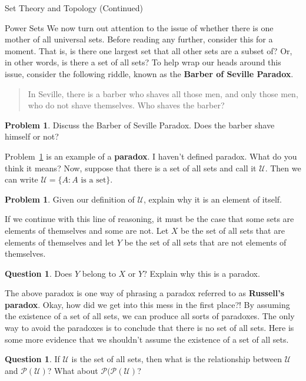 \documentclass[11pt]{article}
\theoremstyle{definition}
\newtheorem{problem}[theorem]{Problem}
\newtheorem{question}[theorem]{Question}
\begin{document}
\begin{section}{Set Theory and Topology (Continued)}
\begin{subsection}{Power Sets}
We now turn out attention to the issue of whether there is one mother of all universal sets.  Before reading any further, consider this for a moment.  That is, is there one largest set that all other sets are a subset of?  Or, in other words, is there a set of all sets?  To help wrap our heads around this issue, consider the following riddle, known as the \textbf{Barber of Seville Paradox}.

\begin{quote}
In Seville, there is a barber who shaves all those men, and only those men, who do not shave themselves.  Who shaves the barber?
\end{quote}

\begin{problem}\label{barber}
Discuss the Barber of Seville Paradox.  Does the barber shave himself or not?
\end{problem}

Problem~\ref{barber} is an example of a \textbf{paradox}.  I haven't defined paradox.  What do you think it means?  Now, suppose that there is a set of all sets and call it $\mathcal{U}$.  Then we can write $\mathcal{U}=\{A:A\mbox{ is a set}\}$.

\begin{problem}
Given our definition of $\mathcal{U}$, explain why it is an element of itself.
\end{problem}

If we continue with this line of reasoning, it must be the case that some sets are elements of themselves and some are not.  Let $X$ be the set of all sets that are elements of themselves and let $Y$ be the set of all sets that are not elements of themselves.

\begin{question}
Does $Y$ belong to $X$ or $Y$?  Explain why this is a paradox.
\end{question}

The above paradox is one way of phrasing a paradox referred to as \textbf{Russell's paradox}.  Okay, how did we get into this mess in the first place?!  By assuming the existence of a set of all sets, we can produce all sorts of paradoxes.  The only way to avoid the paradoxes is to conclude that there is no set of all sets.  Here is some more evidence that we shouldn't assume the existence of a set of all sets.

\begin{question}
If $\mathcal{U}$ is the set of all sets, then what is the relationship between $\mathcal{U}$ and $\mathcal{P}(\mathcal{U})$?  What about $\mathcal{P}(\mathcal{P}(\mathcal{U})$?
\end{question}


\end{subsection}
\end{section}
\end{document}
